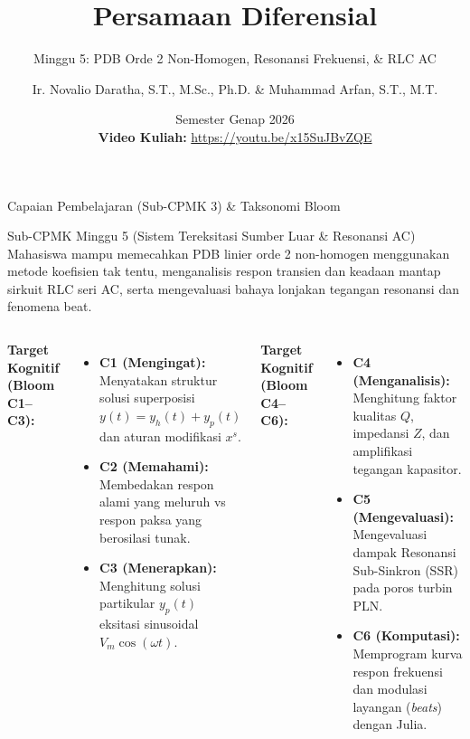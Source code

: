 \documentclass[aspectratio=169,10pt]{beamer}
\title[Persamaan Diferensial (Minggu 5)]{Persamaan Diferensial}
\subtitle{Minggu 5: PDB Orde 2 Non-Homogen, Resonansi Frekuensi, \& RLC AC}
\author[Novalio \& Arfan (UNIB)]{Ir. Novalio Daratha, S.T., M.Sc., Ph.D. \& Muhammad Arfan, S.T., M.T.}
\institute[Teknik Elektro UNIB]{Program Studi S1 Teknik Elektro, Jurusan Teknik Elektro \& Informatika\\Fakultas Teknik, Universitas Bengkulu}
\date[2026]{Semester Genap 2026 \\[1.5mm] {\scriptsize\color{red!85!black}\textbf{Video Kuliah:}} {\scriptsize\url{https://youtu.be/x15SuJBvZQE}} \quad \textbar \quad {\scriptsize\href{https://www.youtube.com/playlist?list=PLS5oOZWXZeTw}{\color{unibblue}\textbf{Playlist YouTube}}}}
\begin{document}
\begin{frame}[plain]
  \titlepage
\end{frame}

\begin{frame}{Capaian Pembelajaran (Sub-CPMK 3) \& Taksonomi Bloom}
  \begin{block}{Sub-CPMK Minggu 5 (Sistem Tereksitasi Sumber Luar \& Resonansi AC)}
    Mahasiswa mampu memecahkan PDB linier orde 2 non-homogen menggunakan metode koefisien tak tentu, menganalisis respon transien dan keadaan mantap sirkuit RLC seri AC, serta mengevaluasi bahaya lonjakan tegangan resonansi dan fenomena beat.
  \end{block}
  \vspace{0.15cm}
  \begin{columns}[t]
    \textbf{Target Kognitif (Bloom C1--C3):}
    \begin{itemize}
      \item \textbf{C1 (Mengingat):} Menyatakan struktur solusi superposisi $y(t) = y_h(t) + y_p(t)$ dan aturan modifikasi $x^s$.
      \item \textbf{C2 (Memahami):} Membedakan respon alami yang meluruh vs respon paksa yang berosilasi tunak.
      \item \textbf{C3 (Menerapkan):} Menghitung solusi partikular $y_p(t)$ eksitasi sinusoidal $V_m \cos(\omega t)$.
    \end{itemize}

    \textbf{Target Kognitif (Bloom C4--C6):}
    \begin{itemize}
      \item \textbf{C4 (Menganalisis):} Menghitung faktor kualitas $Q$, impedansi $Z$, dan amplifikasi tegangan kapasitor.
      \item \textbf{C5 (Mengevaluasi):} Mengevaluasi dampak Resonansi Sub-Sinkron (SSR) pada poros turbin PLN.
      \item \textbf{C6 (Komputasi):} Memprogram kurva respon frekuensi dan modulasi layangan (\textit{beats}) dengan Julia.
    \end{itemize}
  \end{columns}
\end{frame}
\end{document}
